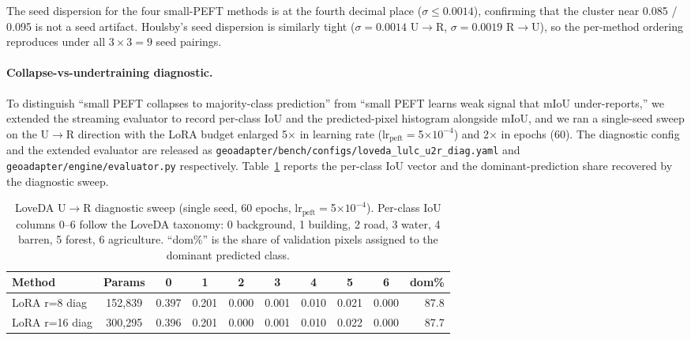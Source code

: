 \documentclass[11pt]{article}
\begin{document}
The seed dispersion for the four small-PEFT methods is at the fourth decimal place ($\sigma \le 0.0014$), confirming that the cluster near 0.085 / 0.095 is not a seed artifact. Houlsby's seed dispersion is similarly tight ($\sigma = 0.0014$ U$\rightarrow$R, $\sigma = 0.0019$ R$\rightarrow$U), so the per-method ordering reproduces under all $3 \times 3 = 9$ seed pairings.

\paragraph{Collapse-vs-undertraining diagnostic.} To distinguish ``small PEFT collapses to majority-class prediction'' from ``small PEFT learns weak signal that mIoU under-reports,'' we extended the streaming evaluator to record per-class IoU and the predicted-pixel histogram alongside mIoU, and we ran a single-seed sweep on the U$\rightarrow$R direction with the LoRA budget enlarged 5$\times$ in learning rate (lr$_{\mathrm{peft}}$$=$5$\times 10^{-4}$) and 2$\times$ in epochs (60). The diagnostic config and the extended evaluator are released as \texttt{geoadapter/bench/configs/loveda\_lulc\_u2r\_diag.yaml} and \texttt{geoadapter/engine/evaluator.py} respectively. Table~\ref{tab:loveda-diag} reports the per-class IoU vector and the dominant-prediction share recovered by the diagnostic sweep.

\begin{table}[h]
\centering
\small
\caption{LoveDA U$\rightarrow$R diagnostic sweep (single seed, 60 epochs, lr$_{\mathrm{peft}}$$=$5$\times 10^{-4}$). Per-class IoU columns 0--6 follow the LoveDA taxonomy: 0 background, 1 building, 2 road, 3 water, 4 barren, 5 forest, 6 agriculture. ``dom\%'' is the share of validation pixels assigned to the dominant predicted class.}
\label{tab:loveda-diag}
\begin{tabular}{lccccccccr}
\toprule
Method & Params & 0 & 1 & 2 & 3 & 4 & 5 & 6 & dom\% \\
\midrule
LoRA r=8  diag & 152{,}839 & 0.397 & 0.201 & 0.000 & 0.001 & 0.010 & 0.021 & 0.000 & 87.8 \\
LoRA r=16 diag & 300{,}295 & 0.396 & 0.201 & 0.000 & 0.001 & 0.010 & 0.022 & 0.000 & 87.7 \\
\bottomrule
\end{tabular}
\end{table}
\end{document}
